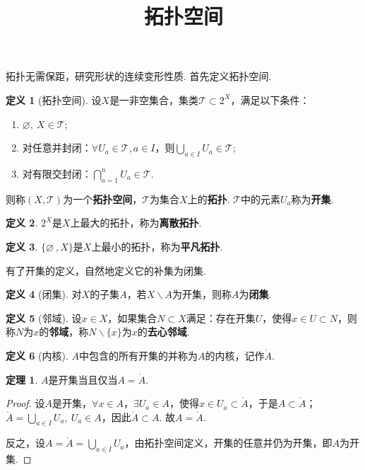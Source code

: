 \documentclass[12pt]{ctexart}
\title{\vspace{-2em}\textbf{拓扑空间}\vspace{-2em}}
\date{ }
\theoremstyle{definition}
\newtheorem{definition}{定义}
\newtheorem{theorem}{定理}
\theoremstyle{plain}
\begin{document}
	\maketitle
	拓扑无需保距，研究形状的连续变形性质. 首先定义拓扑空间.
	\begin{definition}[拓扑空间]
		设$X$是一非空集合，集类$\mathcal{T}\subset 2^X$，满足以下条件：
		\begin{enumerate}
			\item $\varnothing,\ X\in\mathcal{T}$;
			\item 对任意并封闭：$\forall U_a\in\mathcal{T},a\in I$，则$\bigcup_{a\in I}U_a\in\mathcal{T}$;
			\item 对有限交封闭：$\bigcap_{a=1}^{n}U_a\in\mathcal{T}$.
		\end{enumerate}
		则称$(X,\mathcal{T})$为一个\textbf{拓扑空间}，$\mathcal{T}$为集合$X$上的\textbf{拓扑}. $\mathcal{T}$中的元素$U_a$称为\textbf{开集}.
	\end{definition}
	\begin{definition}
		$2^X$是$X$上最大的拓扑，称为\textbf{离散拓扑}.
	\end{definition}
	\begin{definition}
		$\{\varnothing\ ,X\}$是$X$上最小的拓扑，称为\textbf{平凡拓扑}.
	\end{definition}
	有了开集的定义，自然地定义它的补集为闭集.
	\begin{definition}[闭集]
		对$X$的子集$A$，若$X\backslash A$为开集，则称$A$为\textbf{闭集}.
	\end{definition}
	\begin{definition}[邻域]
		设$x\in X$，如果集合$N\subset X$满足：存在开集$U$，使得$x\in U\subset N$，则称$N$为$x$的\textbf{邻域}，称$N\backslash\{x\}$为$x$的\textbf{去心邻域}.
	\end{definition}
	\begin{definition}[内核]
		$A$中包含的所有开集的并称为$A$的内核，记作$\mathring{A}$.
	\end{definition}
	\begin{theorem}
		$A$是开集当且仅当$A=\mathring{A}$.
	\end{theorem}
	\begin{proof}
		 设$A$是开集，$\forall x\in A$，$\exists U_a\in A$，使得$x\in U_a\subset\mathring{A}$，于是$A\subset\mathring{A}$； $\mathring{A}=\bigcup_{a\in I}U_a,\ U_a\in A$，因此$\mathring{A}\subset A$. 故$A=\mathring{A}$.
		
		反之，设$A=\mathring{A}=\bigcup_{a\in I}U_a$，由拓扑空间定义，开集的任意并仍为开集，即$A$为开集.
	\end{proof}
\end{document}
